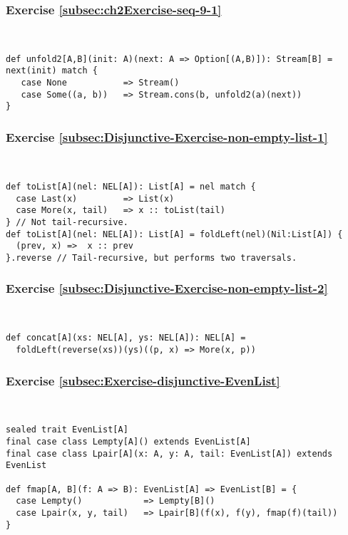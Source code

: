 \subsubsection*{Exercise \ref{subsec:ch2Exercise-seq-9-1}}

~
\begin{lstlisting}
def unfold2[A,B](init: A)(next: A => Option[(A,B)]): Stream[B] = next(init) match {
   case None           => Stream()
   case Some((a, b))   => Stream.cons(b, unfold2(a)(next))
}
\end{lstlisting}



\subsubsection*{Exercise \ref{subsec:Disjunctive-Exercise-non-empty-list-1}}

~
\begin{lstlisting}
def toList[A](nel: NEL[A]): List[A] = nel match {
  case Last(x)         => List(x)
  case More(x, tail)   => x :: toList(tail)
} // Not tail-recursive.
def toList[A](nel: NEL[A]): List[A] = foldLeft(nel)(Nil:List[A]) {
  (prev, x) =>  x :: prev
}.reverse // Tail-recursive, but performs two traversals.
\end{lstlisting}


\subsubsection*{Exercise \ref{subsec:Disjunctive-Exercise-non-empty-list-2}}

~
\begin{lstlisting}
def concat[A](xs: NEL[A], ys: NEL[A]): NEL[A] =
  foldLeft(reverse(xs))(ys)((p, x) => More(x, p))
\end{lstlisting}


\subsubsection*{Exercise \ref{subsec:Exercise-disjunctive-EvenList}}

~
\begin{lstlisting}
sealed trait EvenList[A]
final case class Lempty[A]() extends EvenList[A]
final case class Lpair[A](x: A, y: A, tail: EvenList[A]) extends EvenList

def fmap[A, B](f: A => B): EvenList[A] => EvenList[B] = {
  case Lempty()            => Lempty[B]()
  case Lpair(x, y, tail)   => Lpair[B](f(x), f(y), fmap(f)(tail))
}
\end{lstlisting}


